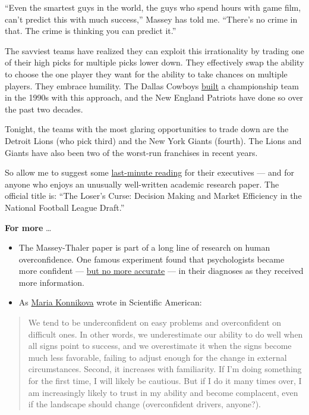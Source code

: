 ``Even the smartest guys in the world, the guys who spend hours with
game film, can't predict this with much success,'' Massey has told me.
``There's no crime in that. The crime is thinking you can predict it.''

The savviest teams have realized they can exploit this irrationality by
trading one of their high picks for multiple picks lower down. They
effectively swap the ability to choose the one player they want for the
ability to take chances on multiple players. They embrace humility. The
Dallas Cowboys
\href{https://www.dallasnews.com/sports/cowboys/2019/10/12/its-been-30-years-since-the-cowboys-traded-herschel-walker-to-the-vikings-fueling-a-dynasty/}{built}
a championship team in the 1990s with this approach, and the New England
Patriots have done so over the past two decades.

Tonight, the teams with the most glaring opportunities to trade down are
the Detroit Lions (who pick third) and the New York Giants (fourth). The
Lions and Giants have also been two of the worst-run franchises in
recent years.

So allow me to suggest some
\href{https://repository.upenn.edu/cgi/viewcontent.cgi?article=1138\&context=oid_papers}{last-minute
reading} for their executives --- and for anyone who enjoys an unusually
well-written academic research paper. The official title is: ``The
Loser's Curse: Decision Making and Market Efficiency in the National
Football League Draft.''

\textbf{For more} \ldots{}

\begin{itemize}
\item
  The Massey-Thaler paper is part of a long line of research on human
  overconfidence. One famous experiment found that psychologists became
  more confident ---
  \href{https://www.nytimes.com/2005/04/24/weekinreview/the-nfl-draft-a-study-in-cockeyed-overconfidence.html}{but
  no more accurate} --- in their diagnoses as they received more
  information.
\item
  As
  \href{https://blogs.scientificamerican.com/guest-blog/lessons-from-sherlock-holmes-confidence-is-good-overconfidence-not-so-much/}{Maria
  Konnikova} wrote in Scientific American:
\end{itemize}

\begin{quote}
We tend to be underconfident on easy problems and overconfident on
difficult ones. In other words, we underestimate our ability to do well
when all signs point to success, and we overestimate it when the signs
become much less favorable, failing to adjust enough for the change in
external circumstances. Second, it increases with familiarity. If I'm
doing something for the first time, I will likely be cautious. But if I
do it many times over, I am increasingly likely to trust in my ability
and become complacent, even if the landscape should change
(overconfident drivers, anyone?).
\end{quote}

